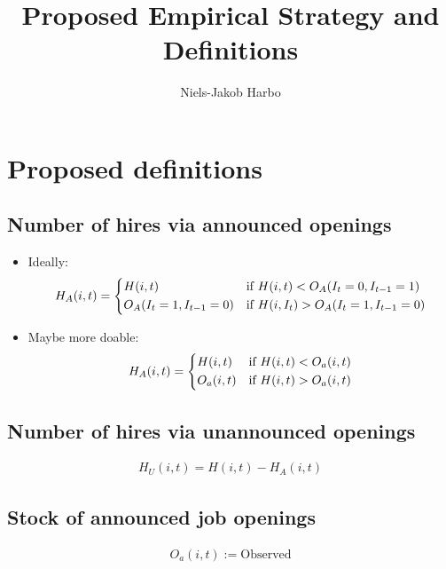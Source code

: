 \documentclass{article}
\title{Proposed Empirical Strategy and Definitions}
\author{Niels-Jakob Harbo}
\begin{document}
\maketitle

\section{Proposed definitions}

\subsection{Number of hires via announced openings}

\begin{itemize}
\item Ideally:
\begin{align}
H_A(i,t)=
\begin{dcases}
H(i,t) &\text{if } H(i,t)<O_A (I_t=0, I_{t-1}=1) \\
O_A (I_t=1, I_{t-1}=0) &\text{if } H(i,I_t)>O_A (I_t=1, I_{t-1}=0)
\end{dcases}
\end{align}


\item Maybe more doable:
\begin{align}
H_A(i,t)=
\begin{dcases}
H(i,t)   &\text{if } H(i,t)<O_a(i,t) \\
O_a(i,t) &\text{if } H(i,t)>O_a(i,t) 
\end{dcases}
\end{align}

\end{itemize}

\subsection{Number of hires via unannounced openings}

\begin{align}
H_U(i,t)=H(i,t)-H_A(i,t)
\end{align}

\subsection{Stock of announced job openings}

\begin{align}
O_a(i,t):= \text{Observed}
\end{align}
\end{document}
